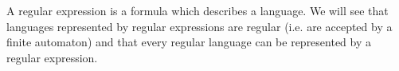 

\setcounter{section}{2}
\setcounter{subsection}{0}
\setcounter{dfn}{0}

A regular expression is a formula which describes a language.
We will see that languages represented by regular expressions are regular (i.e. are accepted by a finite automaton)
and that every regular language can be represented by a regular expression.



